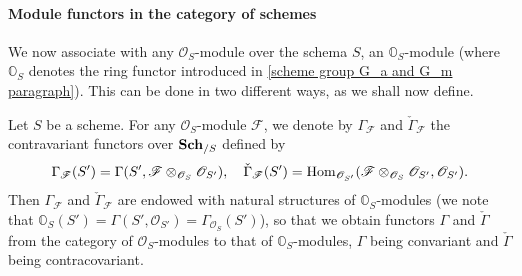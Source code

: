 \paragraph{Module functors in the category of schemes}
We now associate with any $\mathscr{O}_S$-module over the schema $S$, an $\mathbb{O}_S$-module (where $\mathbb{O}_S$ denotes the ring functor introduced in \ref{scheme group G_a and G_m paragraph}). This can be done in two different ways, as we shall now define.
\begin{definition}
Let $S$ be a scheme. For any $\mathscr{O}_S$-module $\mathscr{F}$, we denote by $\Gamma_\mathscr{F}$ and $\check{\Gamma}_\mathscr{F}$ the contravariant functors over $\mathbf{Sch}_{/S}$ defined by
\[\Gamma_\mathscr{F}(S')=\Gamma(S',\mathscr{F}\otimes_{\mathscr{O}_{S}}\mathscr{O}_{S'}),\quad \check{\Gamma}_\mathscr{F}(S')=\mathrm{Hom}_{\mathscr{O}_{S'}}(\mathscr{F}\otimes_{\mathscr{O}_{S}}\mathscr{O}_{S'},\mathscr{O}_{S'}).\]
Then $\Gamma_\mathscr{F}$ and $\check{\Gamma}_\mathscr{F}$ are endowed with natural structures of $\mathbb{O}_S$-modules (we note that $\mathbb{O}_S(S')=\Gamma(S',\mathscr{O}_{S'})=\Gamma_{\mathscr{O}_S}(S')$), so that we obtain functors $\Gamma$ and $\check{\Gamma}$ from the category of $\mathscr{O}_S$-modules to that of $\mathbb{O}_S$-modules, $\Gamma$ being convariant and $\check{\Gamma}$ being contracovariant.
\end{definition}

